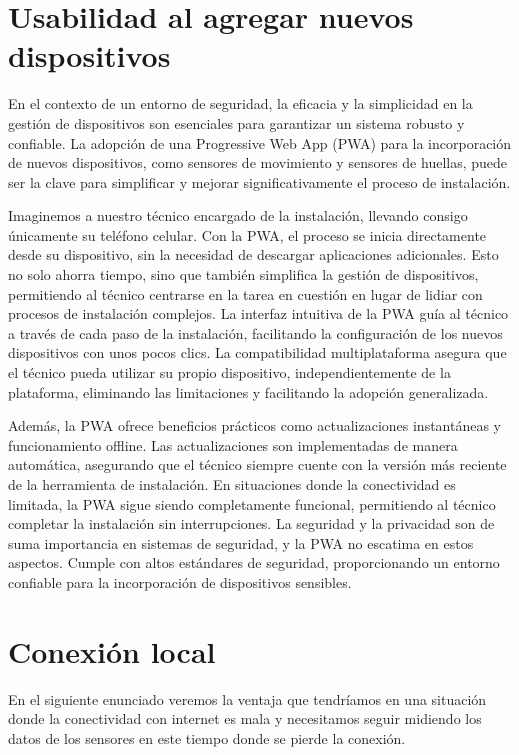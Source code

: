 \documentclass{article}
\begin{document}
\clearpage

\section*{Usabilidad al agregar nuevos dispositivos}
En el contexto de un entorno de seguridad, la eficacia y la simplicidad en la gestión de dispositivos son esenciales para garantizar un sistema robusto y confiable. La adopción de una Progressive Web App (PWA) para la incorporación de nuevos dispositivos, como sensores de movimiento y sensores de huellas, puede ser la clave para simplificar y mejorar significativamente el proceso de instalación.

Imaginemos a nuestro técnico encargado de la instalación, llevando consigo únicamente su teléfono celular. Con la PWA, el proceso se inicia directamente desde su dispositivo, sin la necesidad de descargar aplicaciones adicionales. Esto no solo ahorra tiempo, sino que también simplifica la gestión de dispositivos, permitiendo al técnico centrarse en la tarea en cuestión en lugar de lidiar con procesos de instalación complejos. La interfaz intuitiva de la PWA guía al técnico a través de cada paso de la instalación, facilitando la configuración de los nuevos dispositivos con unos pocos clics. La compatibilidad multiplataforma asegura que el técnico pueda utilizar su propio dispositivo, independientemente de la plataforma, eliminando las limitaciones y facilitando la adopción generalizada.

Además, la PWA ofrece beneficios prácticos como actualizaciones instantáneas y funcionamiento offline. Las actualizaciones son implementadas de manera automática, asegurando que el técnico siempre cuente con la versión más reciente de la herramienta de instalación. En situaciones donde la conectividad es limitada, la PWA sigue siendo completamente funcional, permitiendo al técnico completar la instalación sin interrupciones. La seguridad y la privacidad son de suma importancia en sistemas de seguridad, y la PWA no escatima en estos aspectos. Cumple con altos estándares de seguridad, proporcionando un entorno confiable para la incorporación de dispositivos sensibles.

\clearpage

\section*{Conexión local}
En el siguiente enunciado veremos la ventaja que tendríamos en una situación donde la conectividad con internet es mala y necesitamos seguir midiendo los datos de los sensores en este tiempo donde se pierde la conexión.
\end{document}
